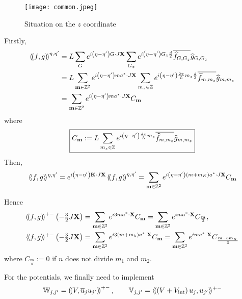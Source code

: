\documentclass[11pt,a4paper,reqno,french,tikz]{amsart}
\newcommand{\pa}[1]{\left( #1 \right)} %
\newcommand{\f}[2]{\frac{#1}{#2}} %
\newcommand{\ind}[1]{_{\textup{#1}}} %
\newcommand{\bbV}{\mathbb{V}}
\newcommand{\db}[1]{\left(\!\left( #1 \right)\!\right)}
\def\bX{{\mathbf X}}
\def\bmm{{\mathbf m}}
\def\bK{{\mathbf K}}
\def\bbV{{\mathbb V}}
\def\bbW{{\mathbb W}}
\def\lAngle{\langle\!\langle}
\def\rAngle{\rangle\!\rangle}
\begin{document}
\begin{figure}
\begin{center}
\texttt{[image: common.jpeg]}
\label{fig:z_drawing}\caption{Situation on the $z$ coordinate}
\end{center}
\end{figure}


Firstly,
\begin{align*}
	\db{f,g}^{\eta,\eta'} &= L \sum_{G} e^{i\pa{\eta-\eta'} G \cdot J \bX} \sum_{G_z} e^{i\pa{\eta-\eta'} G_z \f{d}{2}} \overline{\widehat{f}_{G,G_z}} \widehat{g}_{G,G_z} \\
& = L \sum_{\bmm \in \Z^2} e^{i\pa{\eta-\eta'} ma^* \cdot J \bX} \sum_{m_z \in \Z} e^{i\pa{\eta-\eta'} \f{2\pi}{L} m_z \f{d}{2}} \overline{\widehat{f}_{m,m_z}} \widehat{g}_{m,m_z}\\
& = \sum_{\bmm \in \Z^2} e^{i\pa{\eta-\eta'} ma^* \cdot J \bX} C_\bmm
\end{align*}
where
\begin{align*}
\boxed{C_\bmm := L \sum_{m_z \in \Z} e^{i\pa{\eta-\eta'} \f{d\pi}{L} m_z} \overline{\widehat{f}_{m,m_z}} \widehat{g}_{m,m_z}}
\end{align*}
Then,
\begin{align*}
\lAngle f,g \rAngle ^{\eta,\eta'} = e^{i\pa{\eta-\eta'} \bK \cdot J \bX}\db{f,g}^{\eta,\eta'} =  \sum_{\bmm \in \Z^2} e^{i\pa{\eta-\eta'} \pa{m+m_K}a^* \cdot J \bX} C_\bmm
\end{align*}


Hence
\begin{align*}
	\db{f,g}^{+-}\pa{-\tfrac{3}{2} J \bX} &=  \sum_{\bmm \in \Z^2} e^{i 3 ma^* \cdot \bX} C_\bmm=  \sum_{\bmm \in \Z^2} e^{i m a^* \cdot \bX} C_{\f{\bmm}{3}}, \\
\lAngle f,g \rAngle^{+-}\pa{-\tfrac{3}{2} J\bX} &=  \sum_{\bmm \in \Z^2} e^{i 3 \pa{m+m_k}a^* \cdot \bX} C_\bmm =  \sum_{\bmm \in \Z^2} e^{i m a^* \cdot \bX} C_{\f{\bmm-3\bmm_K}{3}}
\end{align*}
where $C_{\f{\bmm}{n}} :=  0$ if $n$ does not divide $m_1$ and $m_2$. 

For the potentials, we finally need to implement
\begin{align*}
\bbW_{j,j'} = \db{V, \overline{u}_j u_{j'}}^{+-}, \qquad \bbV_{j,j'} = \lAngle \pa{V+V\ind{int}} u_j , u_{j'} \rAngle^{+-}
\end{align*}
\end{document}

